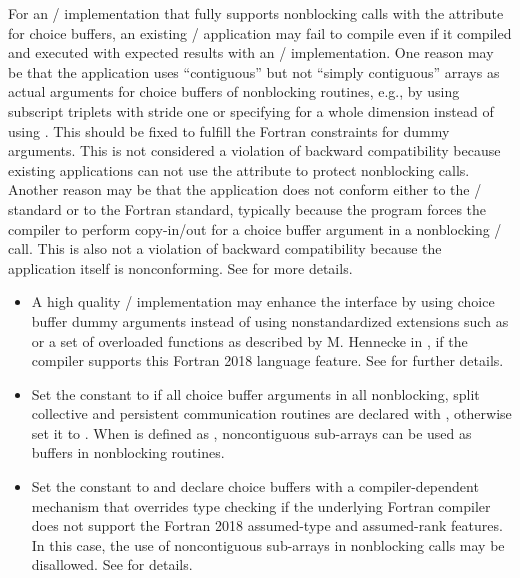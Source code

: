 \begin{users}
For an \MPI/ implementation that fully supports nonblocking
calls with the  attribute for choice buffers,
an existing \MPIIIDOTII/ application may fail to compile even
if it compiled and executed with expected results with an \MPIIIDOTII/ implementation.
One reason may be that the application uses ``contiguous'' but not ``simply contiguous''
 arrays as actual arguments for choice buffers of nonblocking routines,
e.g., by using subscript triplets with stride one or specifying 
for a whole dimension instead of using \code{(:)}. This should be fixed
to fulfill the Fortran constraints for 
dummy arguments.
This is not considered a violation of backward compatibility because
existing applications can not use the   attribute
to protect nonblocking calls.
Another reason may be that
the application does not conform either to the \MPI/ standard
or to the Fortran standard,
typically because the program forces the compiler to
perform copy-in/out for a choice buffer argument in a
nonblocking \MPI/ call.
This is also not a violation of backward compatibility because
the application itself is nonconforming.
See  for more details.
\end{users}
\begin{itemize}
\item A high quality \MPI/ implementation may enhance the interface
by using  choice buffer dummy arguments
instead of using
nonstandardized extensions such as 
or a set of overloaded functions as described by
M. Hennecke in \cite{hennecke}, if the compiler
supports this Fortran 2018 language feature.
See 
for further details.
\item
Set the  constant
 to 
if all choice buffer arguments
in all nonblocking, split collective and persistent communication routines
are declared with
, otherwise set it to .
When  is defined as ,
noncontiguous sub-arrays can be used as buffers
in nonblocking routines.
\item Set the 
constant to  and
declare choice buffers with a compiler-dependent mechanism that
overrides type checking if the underlying Fortran compiler does not
support the Fortran 2018 assumed-type and assumed-rank
features.
In this case, the use of noncontiguous sub-arrays
in nonblocking calls may be disallowed.
See  for details.
\end{itemize}

